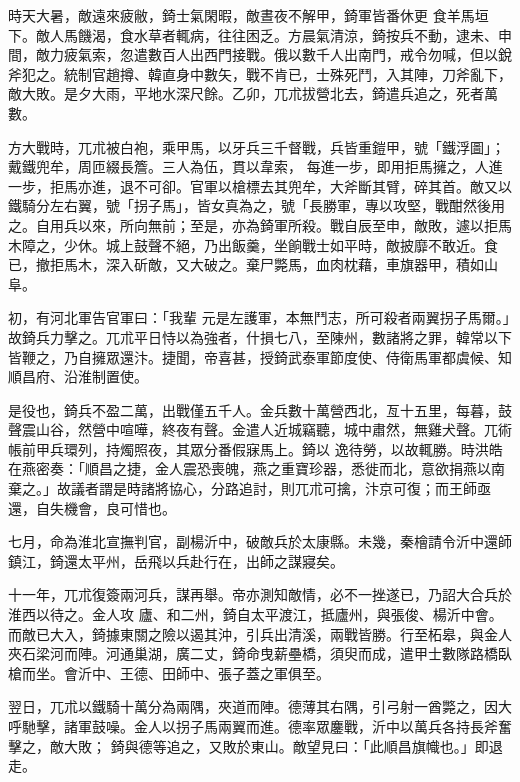 \begin{pinyinscope}
 時天大暑，敵遠來疲敝，錡士氣閑暇，敵晝夜不解甲，錡軍皆番休更
 食羊馬垣下。敵人馬饑渴，食水草者輒病，往往困乏。方晨氣清涼，錡按兵不動，逮未、申間，敵力疲氣索，忽遣數百人出西門接戰。俄以數千人出南門，戒令勿喊，但以銳斧犯之。統制官趙撙、韓直身中數矢，戰不肯已，士殊死鬥，入其陣，刀斧亂下，敵大敗。是夕大雨，平地水深尺餘。乙卯，兀朮拔營北去，錡遣兵追之，死者萬數。



 方大戰時，兀朮被白袍，乘甲馬，以牙兵三千督戰，兵皆重鎧甲，號「鐵浮圖」；戴鐵兜牟，周匝綴長簷。三人為伍，貫以韋索，
 每進一步，即用拒馬擁之，人進一步，拒馬亦進，退不可卻。官軍以槍標去其兜牟，大斧斷其臂，碎其首。敵又以鐵騎分左右翼，號「拐子馬」，皆女真為之，號「長勝軍，專以攻堅，戰酣然後用之。自用兵以來，所向無前；至是，亦為錡軍所殺。戰自辰至申，敵敗，遽以拒馬木障之，少休。城上鼓聲不絕，乃出飯羹，坐餉戰士如平時，敵披靡不敢近。食已，撤拒馬木，深入斫敵，又大破之。棄尸斃馬，血肉枕藉，車旗器甲，積如山阜。



 初，有河北軍告官軍曰：「我輩
 元是左護軍，本無鬥志，所可殺者兩翼拐子馬爾。」故錡兵力擊之。兀朮平日恃以為強者，什損七八，至陳州，數諸將之罪，韓常以下皆鞭之，乃自擁眾還汴。捷聞，帝喜甚，授錡武泰軍節度使、侍衛馬軍都虞候、知順昌府、沿淮制置使。



 是役也，錡兵不盈二萬，出戰僅五千人。金兵數十萬營西北，亙十五里，每暮，鼓聲震山谷，然營中喧嘩，終夜有聲。金遣人近城竊聽，城中肅然，無雞犬聲。兀術帳前甲兵環列，持燭照夜，其眾分番假寐馬上。錡以
 逸待勞，以故輒勝。時洪皓在燕密奏：「順昌之捷，金人震恐喪魄，燕之重寶珍器，悉徙而北，意欲捐燕以南棄之。」故議者謂是時諸將協心，分路追討，則兀朮可擒，汴京可復；而王師亟還，自失機會，良可惜也。



 七月，命為淮北宣撫判官，副楊沂中，破敵兵於太康縣。未幾，秦檜請令沂中還師鎮江，錡還太平州，岳飛以兵赴行在，出師之謀寢矣。



 十一年，兀朮復簽兩河兵，謀再舉。帝亦測知敵情，必不一挫遂已，乃詔大合兵於淮西以待之。金人攻
 廬、和二州，錡自太平渡江，抵廬州，與張俊、楊沂中會。而敵已大入，錡據東關之險以遏其沖，引兵出清溪，兩戰皆勝。行至柘皋，與金人夾石梁河而陣。河通巢湖，廣二丈，錡命曳薪壘橋，須臾而成，遣甲士數隊路橋臥槍而坐。會沂中、王德、田師中、張子蓋之軍俱至。



 翌日，兀朮以鐵騎十萬分為兩隅，夾道而陣。德薄其右隅，引弓射一酋斃之，因大呼馳擊，諸軍鼓噪。金人以拐子馬兩翼而進。德率眾鏖戰，沂中以萬兵各持長斧奮擊之，敵大敗；
 錡與德等追之，又敗於東山。敵望見曰：「此順昌旗幟也。」即退走。




\end{pinyinscope}
